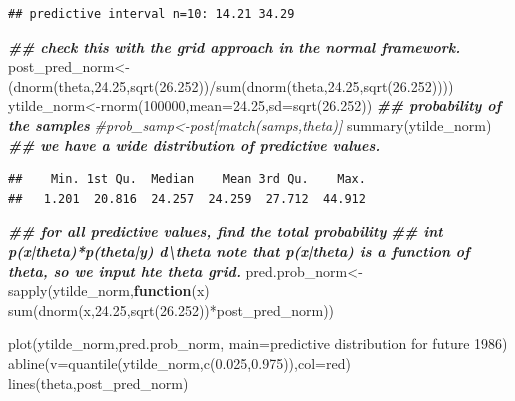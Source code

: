 \documentclass[
]{book}
\newenvironment{Shaded}{\begin{snugshade}}{\end{snugshade}}
\newcommand{\AttributeTok}[1]{\textcolor[rgb]{0.77,0.63,0.00}{#1}}
\newcommand{\CommentTok}[1]{\textcolor[rgb]{0.56,0.35,0.01}{\textit{#1}}}
\newcommand{\ControlFlowTok}[1]{\textcolor[rgb]{0.13,0.29,0.53}{\textbf{#1}}}
\newcommand{\DecValTok}[1]{\textcolor[rgb]{0.00,0.00,0.81}{#1}}
\newcommand{\DocumentationTok}[1]{\textcolor[rgb]{0.56,0.35,0.01}{\textbf{\textit{#1}}}}
\newcommand{\FloatTok}[1]{\textcolor[rgb]{0.00,0.00,0.81}{#1}}
\newcommand{\FunctionTok}[1]{\textcolor[rgb]{0.00,0.00,0.00}{#1}}
\newcommand{\NormalTok}[1]{#1}
\newcommand{\OtherTok}[1]{\textcolor[rgb]{0.56,0.35,0.01}{#1}}
\newcommand{\SpecialCharTok}[1]{\textcolor[rgb]{0.00,0.00,0.00}{#1}}
\newcommand{\StringTok}[1]{\textcolor[rgb]{0.31,0.60,0.02}{#1}}
\theoremstyle{definition}
\theoremstyle{definition}
\theoremstyle{definition}
\theoremstyle{definition}
\theoremstyle{remark}
\begin{document}
\begin{verbatim}
## predictive interval n=10: 14.21 34.29
\end{verbatim}

\begin{Shaded}
\begin{Highlighting}[]
   \DocumentationTok{\#\# check this with the grid approach in the normal framework.  }
\NormalTok{  post\_pred\_norm}\OtherTok{\textless{}{-}}\NormalTok{(}\FunctionTok{dnorm}\NormalTok{(theta,}\FloatTok{24.25}\NormalTok{,}\FunctionTok{sqrt}\NormalTok{(}\FloatTok{26.252}\NormalTok{))}\SpecialCharTok{/}\FunctionTok{sum}\NormalTok{(}\FunctionTok{dnorm}\NormalTok{(theta,}\FloatTok{24.25}\NormalTok{,}\FunctionTok{sqrt}\NormalTok{(}\FloatTok{26.252}\NormalTok{))))}
\NormalTok{   ytilde\_norm}\OtherTok{\textless{}{-}}\FunctionTok{rnorm}\NormalTok{(}\DecValTok{100000}\NormalTok{,}\AttributeTok{mean=}\FloatTok{24.25}\NormalTok{,}\AttributeTok{sd=}\FunctionTok{sqrt}\NormalTok{(}\FloatTok{26.252}\NormalTok{)) }
 \DocumentationTok{\#\# probability of the samples }
 \CommentTok{\#prob\_samp\textless{}{-}post[match(samps,theta)]}
  \FunctionTok{summary}\NormalTok{(ytilde\_norm) }\DocumentationTok{\#\# we have a wide distribution of predictive values.}
\end{Highlighting}
\end{Shaded}

\begin{verbatim}
##    Min. 1st Qu.  Median    Mean 3rd Qu.    Max. 
##   1.201  20.816  24.257  24.259  27.712  44.912
\end{verbatim}

\begin{Shaded}
\begin{Highlighting}[]
\DocumentationTok{\#\# for all predictive values,  find the total probability  }
   \DocumentationTok{\#\# int p(x|theta)*p(theta|y) d\textbackslash{}theta  note that p(x|theta) is a function of theta, so we input hte theta grid.}
\NormalTok{ pred.prob\_norm}\OtherTok{\textless{}{-}}\FunctionTok{sapply}\NormalTok{(ytilde\_norm,}\ControlFlowTok{function}\NormalTok{(x) }\FunctionTok{sum}\NormalTok{(}\FunctionTok{dnorm}\NormalTok{(x,}\FloatTok{24.25}\NormalTok{,}\FunctionTok{sqrt}\NormalTok{(}\FloatTok{26.252}\NormalTok{))}\SpecialCharTok{*}\NormalTok{post\_pred\_norm))  }
  
 \FunctionTok{plot}\NormalTok{(ytilde\_norm,pred.prob\_norm, }\AttributeTok{main=}\StringTok{\textquotesingle{}predictive distribution for future 1986\textquotesingle{}}\NormalTok{)}
 \FunctionTok{abline}\NormalTok{(}\AttributeTok{v=}\FunctionTok{quantile}\NormalTok{(ytilde\_norm,}\FunctionTok{c}\NormalTok{(}\FloatTok{0.025}\NormalTok{,}\FloatTok{0.975}\NormalTok{)),}\AttributeTok{col=}\StringTok{\textquotesingle{}red\textquotesingle{}}\NormalTok{)}
 \FunctionTok{lines}\NormalTok{(theta,post\_pred\_norm)}
\end{Highlighting}
\end{Shaded}
\end{document}
